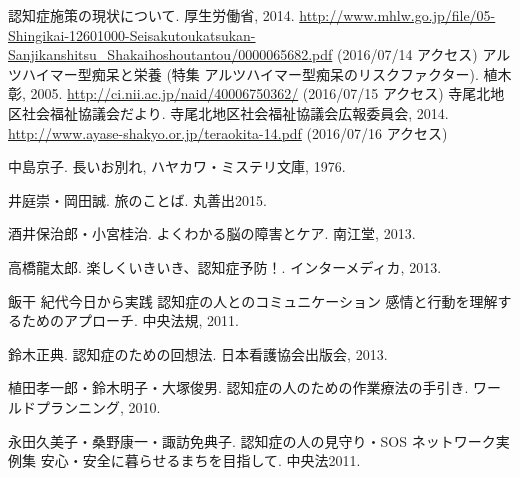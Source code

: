 \documentclass[openany,11pt,papersize]{jsbook}
\begin{document}

\begin{thebibliography}{9}
     認知症施策の現状について. 厚生労働省, 2014. \url{http://www.mhlw.go.jp/file/05-Shingikai-12601000-Seisakutoukatsukan-Sanjikanshitsu_Shakaihoshoutantou/0000065682.pdf} (2016/07/14 アクセス)
     アルツハイマー型痴呆と栄養 (特集 アルツハイマー型痴呆のリスクファクター). 植木 彰, 2005. \url{http://ci.nii.ac.jp/naid/40006750362/} (2016/07/15 アクセス)
     寺尾北地区社会福祉協議会だより. 寺尾北地区社会福祉協議会広報委員会, 2014. \url{http://www.ayase-shakyo.or.jp/teraokita-14.pdf} (2016/07/16 アクセス)
    \item[]
    \item[] 中島京子. 長いお別れ, ハヤカワ・ミステリ文庫, 1976.
    \item[] 井庭崇・岡田誠. 旅のことば. 丸善出2015.
    \item[] 酒井保治郎・小宮桂治. よくわかる脳の障害とケア. 南江堂, 2013.
    \item[] 高橋龍太郎. 楽しくいきいき、認知症予防！. インターメディカ, 2013.
    \item[] 飯干 紀代今日から実践 認知症の人とのコミュニケーション 感情と行動を理解するためのアプローチ. 中央法規, 2011.
    \item[] 鈴木正典. 認知症のための回想法. 日本看護協会出版会, 2013.
    \item[] 植田孝一郎・鈴木明子・大塚俊男. 認知症の人のための作業療法の手引き. ワールドプランニング, 2010.
    \item[] 永田久美子・桑野康一・諏訪免典子. 認知症の人の見守り・SOS ネットワーク実例集 安心・安全に暮らせるまちを目指して. 中央法2011.
\end{thebibliography}
\end{document}
